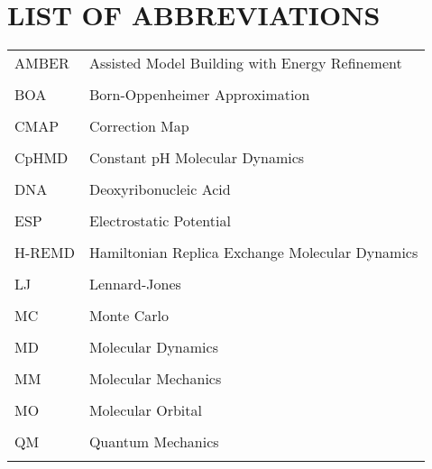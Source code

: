 
\chapter*{LIST OF ABBREVIATIONS}

\singlespacing

\begin{tabular}{lp{5in}}

AMBER & Assisted Model Building with Energy Refinement \\ \\

BOA & Born-Oppenheimer Approximation \\ \\

CMAP & Correction Map \\ \\ 

CpHMD & Constant pH Molecular Dynamics \\ \\

DNA & Deoxyribonucleic Acid \\ \\

ESP & Electrostatic Potential \\ \\

H-REMD & Hamiltonian Replica Exchange Molecular Dynamics \\ \\

LJ & Lennard-Jones \\ \\

MC & Monte Carlo \\ \\

MD & Molecular Dynamics \\ \\

MM & Molecular Mechanics \\ \\

MO & Molecular Orbital \\ \\

QM & Quantum Mechanics \\ \\


\end{tabular}

